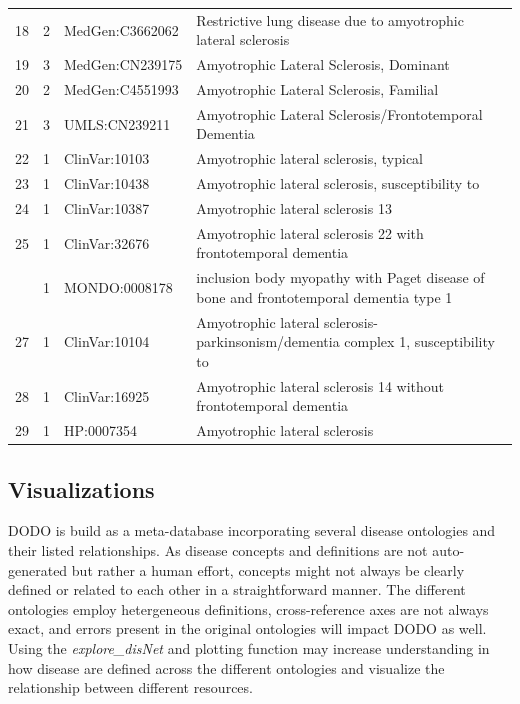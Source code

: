 \documentclass[9pt,a4paper,]{extarticle}
\begin{document}
\begin{table}
{\begin{tabular}[t]{rrll}
18 & 2 & MedGen:C3662062 & Restrictive lung disease due to amyotrophic lateral sclerosis\\
\rowcolor{gray!6}  19 & 3 & MedGen:CN239175 & Amyotrophic Lateral Sclerosis, Dominant\\
20 & 2 & MedGen:C4551993 & Amyotrophic Lateral Sclerosis, Familial\\
\addlinespace
\rowcolor{gray!6}  21 & 3 & UMLS:CN239211 & Amyotrophic Lateral Sclerosis/Frontotemporal Dementia\\
22 & 1 & ClinVar:10103 & Amyotrophic lateral sclerosis, typical\\
\rowcolor{gray!6}  23 & 1 & ClinVar:10438 & Amyotrophic lateral sclerosis, susceptibility to\\
24 & 1 & ClinVar:10387 & Amyotrophic lateral sclerosis 13\\
\rowcolor{gray!6}  25 & 1 & ClinVar:32676 & Amyotrophic lateral sclerosis 22 with frontotemporal dementia\\
\addlinespace
26 & 1 & MONDO:0008178 & inclusion body myopathy with Paget disease of bone and frontotemporal dementia type 1\\
\rowcolor{gray!6}  27 & 1 & ClinVar:10104 & Amyotrophic lateral sclerosis-parkinsonism/dementia complex 1, susceptibility to\\
28 & 1 & ClinVar:16925 & Amyotrophic lateral sclerosis 14 without frontotemporal dementia\\
\rowcolor{gray!6}  29 & 1 & HP:0007354 & Amyotrophic lateral sclerosis\\
\bottomrule
\end{tabular}}
\end{table}

\hypertarget{visualizations}{%
\subsection{Visualizations}\label{visualizations}}

DODO is build as a meta-database incorporating several disease ontologies and their listed relationships. As disease concepts and definitions are not auto-generated but rather a human effort, concepts might not always be clearly defined or related to each other in a straightforward manner. The different ontologies employ hetergeneous definitions, cross-reference axes are not always exact, and errors present in the original ontologies will impact DODO as well. Using the \emph{explore\_disNet} and plotting function may increase understanding in how disease are defined across the different ontologies and visualize the relationship between different resources.
\end{document}
